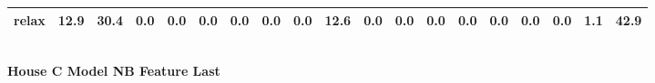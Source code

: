 \documentclass{article}
\begin{document}
\begin{sideways}
\begin{tabular}{lrrrrrrrrrrrrrrrrrr}
relax                         &        12.9 &               30.4 &           0.0 &                          0.0 &                0.0 &                0.0 &                        0.0 &          0.0 &             12.6 &                0.0 &                    0.0 &                      0.0 &                  0.0 &                   0.0 &              0.0 &              0.0 &                                  1.1 &         42.9 \\
\bottomrule
\end{tabular}
\end{sideways}
\normalsize
\vspace{1cm}\\
\textbf{House C Model NB Feature Last}\\
\vspace{1cm}\\
\end{document}
